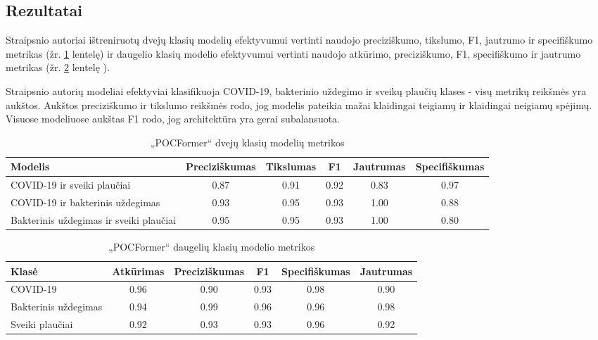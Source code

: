 \documentclass[fleqn]{VUMIFKompMagistrinis}
\begin{document}
\subsection{Rezultatai}
Straipsnio autoriai ištreniruotų dvejų klasių modelių efektyvumui vertinti naudojo preciziškumo, tikslumo, F1, jautrumo ir specifiškumo  metrikas (žr. \ref{tab:statistikos1} lentelę) ir daugelio klasių modelio efektyvumui vertinti naudojo atkūrimo, preciziškumo, F1, specifiškumo ir jautrumo metrikas (žr. \ref{tab:statistikos2} lentelę ). 
\par
Straipsnio autorių modeliai efektyviai klasifikuoja COVID-19, bakterinio uždegimo ir sveikų plaučių klases - visų metrikų reikšmės yra aukštos. Aukštos preciziškumo ir tikslumo reikšmės rodo, jog modelis pateikia mažai klaidingai teigiamų ir klaidingai neigiamų spėjimų. Visuose modeliuose aukštas F1 rodo, jog architektūra yra gerai subalansuota.
\begin{table}[H]\footnotesize
  \centering
  \caption{„POCFormer“ dvejų klasių modelių metrikos \cite{PAY21}}
  \begin{tabular}{|l|c|c|c|c|c|} \hline
    Modelis & Preciziškumas & Tikslumas & F1 & Jautrumas & Specifiškumas \\
    \hline
    COVID-19 ir sveiki plaučiai & 0.87 & 0.91 & 0.92 & 0.83 & 0.97 \\
    COVID-19 ir bakterinis uždegimas & 0.93 & 0.95 & 0.93 & 1.00 & 0.88 \\
    Bakterinis uždegimas ir sveiki plaučiai & 0.95 & 0.95 & 0.93 & 1.00 & 0.80 \\
    \hline
  \end{tabular}
  \label{tab:statistikos1}
\end{table}\begin{table}[H]\footnotesize
  \centering
  \caption{„POCFormer“ daugelių klasių modelio metrikos \cite{PAY21}}
  \begin{tabular}{|l|c|c|c|c|c|} \hline
     Klasė & Atkūrimas & Preciziškumas & F1 & Specifiškumas & Jautrumas \\
    \hline
    COVID-19             & 0.96 & 0.90 & 0.93 & 0.98 & 0.90 \\
    Bakterinis uždegimas & 0.94 & 0.99 & 0.96 & 0.96 & 0.98 \\
    Sveiki plaučiai      & 0.92 & 0.93 & 0.93 & 0.96 & 0.92 \\
    \hline
  \end{tabular}
  \label{tab:statistikos2}
\end{table}
\par
\end{document}
